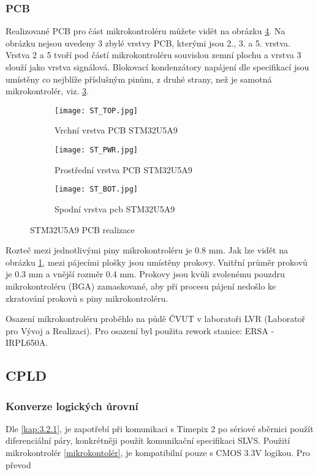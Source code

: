 	\subsubsection{PCB}
	Realizované PCB pro část mikrokontroléru můžete vidět na obrázku \ref{fig:ST_layout}. Na obrázku nejsou uvedeny 3 zbylé vrstvy PCB, kterými jsou 2., 3. a 5. vrstva. Vrstva 2 a 5 tvoří pod částí mikrokontroléru souvislou zemní plochu a vrstva 3 slouží jako vrstva signálová. Blokovací kondenzátory napájení dle specifikací \cite{STM32U5A9_RM} jsou umístěny co nejblíže příslušným pinům, z druhé strany, než je samotná mikrokontrolér, viz. \ref{fig:ST_BOT}. 
	\begin{figure}[h!]
		\centering
		\captionsetup{justification=centering}
		\begin{subfigure}[b]{0.3\textwidth}
			\centering
			\texttt{[image: ST\_TOP.jpg]}
			\caption{Vrchní vrstva PCB STM32U5A9}
			\label{fig:ST_TOP}
		\end{subfigure}
		\hfill
		\begin{subfigure}[b]{0.3\textwidth}
			\centering
				\texttt{[image: ST\_PWR.jpg]}
			\caption{Prostřední vrstva PCB STM32U5A9}
			\label{fig:ST_PWR}
		\end{subfigure}
		\hfill
		\begin{subfigure}[b]{0.3\textwidth}
			\centering
				\texttt{[image: ST\_BOT.jpg]}
			\caption{Spodní vrstva pcb STM32U5A9}
			\label{fig:ST_BOT}
		\end{subfigure}
		\caption{STM32U5A9 PCB realizace}
		\label{fig:ST_layout}
	\end{figure}
	Rozteč mezi jednotlivými piny mikrokontroléru je 0.8 mm. Jak lze vidět na obrázku \ref{fig:ST_TOP}, mezi pájecími plošky jsou umístěny prokovy. Vnitřní průměr prokovů je 0.3 mm a vnější rozměr 0.4 mm. Prokovy jsou kvůli zvolenému pouzdru mikrokontroléru (BGA) zamaskované, aby při procesu pájení nedošlo ke zkratování prokovů s piny mikrokontroléru.
	\par Osazení mikrokontroléru proběhlo na půdě ČVUT v laboratoři LVR (Laboratoř pro Vývoj a Realizaci). Pro osazení byl použita rework stanice: ERSA - IRPL650A.
	
	\subsection{CPLD}	%
	\label{CPLD}
	\subsubsection{Konverze logických úrovní}
	Dle \ref{kap:3.2.1}, je zapotřebí při komunikaci s Timepix 2 po sériové sběrnici použít diferenciální páry, konkrétněji použít komunikační specifikaci SLVS. Použití mikrokontrolér \ref{mikrokontolér}, je kompatibilní pouze s CMOS 3.3V logikou. Pro převod 
